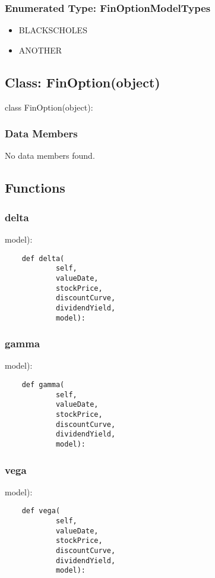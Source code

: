 \documentclass[twoside,11pt]{book}
\begin{document}
\subsubsection{Enumerated Type: FinOptionModelTypes}
\begin{itemize}
\item{BLACKSCHOLES}
\item{ANOTHER}
\end{itemize}

\subsection*{Class: FinOption(object)}
class FinOption(object): 

\subsubsection*{Data Members}
No data members found.

\subsection*{Functions}

\subsubsection*{{\bf delta}}
model): 

\begin{lstlisting}
    def delta(
            self,
            valueDate,
            stockPrice,
            discountCurve,
            dividendYield,
            model):
\end{lstlisting}

\subsubsection*{{\bf gamma}}
model): 

\begin{lstlisting}
    def gamma(
            self,
            valueDate,
            stockPrice,
            discountCurve,
            dividendYield,
            model):
\end{lstlisting}

\subsubsection*{{\bf vega}}
model): 

\begin{lstlisting}
    def vega(
            self,
            valueDate,
            stockPrice,
            discountCurve,
            dividendYield,
            model):
\end{lstlisting}
\end{document}
